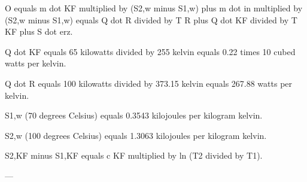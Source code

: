 O equals m dot KF multiplied by (S2,w minus S1,w) plus m dot in multiplied by (S2,w minus S1,w) equals Q dot R divided by T R plus Q dot KF divided by T KF plus S dot erz.  

Q dot KF equals 65 kilowatts divided by 255 kelvin equals 0.22 times 10 cubed watts per kelvin.  

Q dot R equals 100 kilowatts divided by 373.15 kelvin equals 267.88 watts per kelvin.  

S1,w (70 degrees Celsius) equals 0.3543 kilojoules per kilogram kelvin.  

S2,w (100 degrees Celsius) equals 1.3063 kilojoules per kilogram kelvin.  

S2,KF minus S1,KF equals c KF multiplied by ln (T2 divided by T1).  

---